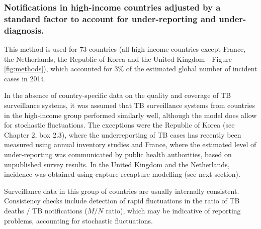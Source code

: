 \subsubsection {Notifications in high-income countries adjusted by a standard factor to account for under-reporting and under-diagnosis.} This method is used for 73 countries (all high-income countries except France, the Netherlands, the Republic of Korea and the United Kingdom - Figure \ref{fig:methods}), which accounted for 3\% of the estimated global number of incident cases in 2014.

In the absence of country-specific data on the quality and coverage of TB surveillance systems, it was assumed that TB surveillance systems from countries in the high-income group performed similarly well, although the model does allow for stochastic fluctuations. The exceptions were the Republic of Korea (see Chapter 2, box 2.3), where the underreporting of TB cases has recently been measured using annual inventory studies and France, where the estimated level of under-reporting was communicated by public health authorities, based on unpublished survey results. In the United Kingdom and the Netherlands, incidence was obtained using capture-recapture modelling (see next section).

Surveillance data in this group of countries are usually internally consistent. Consistency checks include detection of rapid fluctuations in the ratio of TB deaths / TB notifications ($M/N$ ratio), which may be indicative of reporting problems, accounting for stochastic fluctuations.




